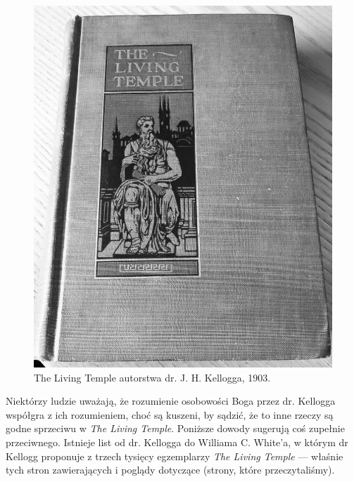 \begin{figure}[hp]
    \centering
    \includegraphics[width=1\linewidth]{images/TLT.jpg}
    \caption*{The Living Temple autorstwa dr. J. H. Kellogga, 1903.}
    \label{fig:tlt}
\end{figure}

Niektórzy ludzie uważają, że rozumienie osobowości Boga przez dr. Kellogga współgra z ich rozumieniem, choć są kuszeni, by sądzić, że to inne rzeczy są godne sprzeciwu w \textit{The Living Temple}. Poniższe dowody sugerują coś zupełnie przeciwnego. Istnieje list od dr. Kellogga do Williama C. White’a, w którym dr Kellogg proponuje  z trzech tysięcy egzemplarzy \textit{The Living Temple} — właśnie tych stron zawierających  i poglądy dotyczące  (strony, które przeczytaliśmy).

